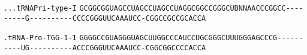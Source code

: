 \documentclass{article}
\newcommand{\rnabox}[1]{\colorbox{#1}{\texttt{#1}}}
\begin{document}
\vspace{-0.5mm}

\texttt{...tRNAPri-type-I}
\rnabox{G}\rnabox{C}\rnabox{G}\rnabox{G}\rnabox{C}\rnabox{G}\rnabox{G}\rnabox{U}\rnabox{A}\rnabox{G}\rnabox{C}\rnabox{C}\rnabox{U}\rnabox{A}\rnabox{G}\rnabox{C}\rnabox{C}\rnabox{U}\rnabox{A}\rnabox{G}\rnabox{C}\rnabox{C}\rnabox{U}\rnabox{A}\rnabox{G}\rnabox{G}\rnabox{C}\rnabox{G}\rnabox{G}\rnabox{C}\rnabox{C}\rnabox{G}\rnabox{G}\rnabox{G}\rnabox{C}\rnabox{U}\rnabox{B}\rnabox{N}\rnabox{N}\rnabox{A}\rnabox{A}\rnabox{C}\rnabox{C}\rnabox{C}\rnabox{G}\rnabox{G}\rnabox{C}\rnabox{C}\rnabox{-}\rnabox{-}\rnabox{-}\rnabox{-}\rnabox{-}\rnabox{-}\rnabox{-}\rnabox{-}\rnabox{-}\rnabox{G}\rnabox{-}\rnabox{-}\rnabox{-}\rnabox{-}\rnabox{-}\rnabox{-}\rnabox{-}\rnabox{-}\rnabox{-}\rnabox{-}\rnabox{C}\rnabox{C}\rnabox{C}\rnabox{C}\rnabox{G}\rnabox{G}\rnabox{G}\rnabox{U}\rnabox{U}\rnabox{C}\rnabox{A}\rnabox{A}\rnabox{A}\rnabox{U}\rnabox{C}\rnabox{C}\rnabox{-}\rnabox{C}\rnabox{G}\rnabox{G}\rnabox{C}\rnabox{C}\rnabox{G}\rnabox{C}\rnabox{C}\rnabox{G}\rnabox{C}\rnabox{A}\rnabox{C}\rnabox{C}\rnabox{A}

\vspace{-0.5mm}

\texttt{.tRNA-Pro-TGG-1-1}
\rnabox{G}\rnabox{G}\rnabox{G}\rnabox{G}\rnabox{C}\rnabox{C}\rnabox{G}\rnabox{U}\rnabox{A}\rnabox{G}\rnabox{G}\rnabox{G}\rnabox{U}\rnabox{A}\rnabox{G}\rnabox{C}\rnabox{U}\rnabox{U}\rnabox{G}\rnabox{G}\rnabox{C}\rnabox{C}\rnabox{C}\rnabox{A}\rnabox{U}\rnabox{C}\rnabox{C}\rnabox{U}\rnabox{G}\rnabox{C}\rnabox{G}\rnabox{G}\rnabox{G}\rnabox{C}\rnabox{U}\rnabox{U}\rnabox{U}\rnabox{G}\rnabox{G}\rnabox{G}\rnabox{A}\rnabox{G}\rnabox{C}\rnabox{C}\rnabox{C}\rnabox{G}\rnabox{-}\rnabox{-}\rnabox{-}\rnabox{-}\rnabox{-}\rnabox{-}\rnabox{-}\rnabox{-}\rnabox{-}\rnabox{-}\rnabox{U}\rnabox{G}\rnabox{-}\rnabox{-}\rnabox{-}\rnabox{-}\rnabox{-}\rnabox{-}\rnabox{-}\rnabox{-}\rnabox{-}\rnabox{-}\rnabox{A}\rnabox{C}\rnabox{C}\rnabox{C}\rnabox{G}\rnabox{G}\rnabox{G}\rnabox{U}\rnabox{U}\rnabox{C}\rnabox{A}\rnabox{A}\rnabox{A}\rnabox{U}\rnabox{C}\rnabox{C}\rnabox{-}\rnabox{C}\rnabox{G}\rnabox{G}\rnabox{C}\rnabox{G}\rnabox{G}\rnabox{C}\rnabox{C}\rnabox{C}\rnabox{C}\rnabox{A}\rnabox{C}\rnabox{C}\rnabox{A}

\vspace{-0.5mm}
\end{document}
